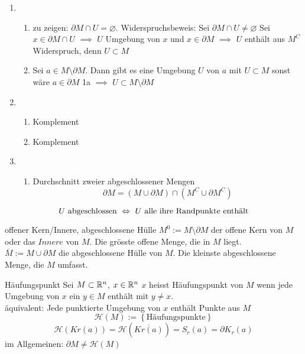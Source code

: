 \begin{Bew}
  \begin{enumerate}
    \item \begin{enumerate}
        \item zu zeigen: $\partial M\cap U=\varnothing$. Widerspruchsbeweis: Sei $\partial M\cap U\neq \varnothing$ Sei $x\in \partial M\cap U$ $\implies$ $U$ Umgebung von $x$ und $x\in\partial M$ $\implies$ $U$ enthält aus $M^C$ Widerspruch, denn $U\subset M$
        \item Sei $a\in M\setminus \partial M$. Dann gibt es eine Umgebung $U$ von $a$ mit $U\subset M$ sonst wäre $a\in \partial M$ 1a $\implies$ $U\subset M\setminus \partial M$
      \end{enumerate}
    \item\begin{enumerate}
        \item Komplement
        \item Komplement
      \end{enumerate}
    \item\begin{enumerate}
        \item Durchschnitt zweier abgeschlossener Mengen
          \[\partial M=(M\cup\partial M)\cap(M^C\cup \partial M^C)\]
      \end{enumerate}
  \end{enumerate}
\end{Bew}
\begin{Kor}
  \[U\ \text{abgeschlossen}\ \Lra\ U\ \text{alle ihre Randpunkte enthält}\]
\end{Kor}
\begin{Not}{offener Kern/Innere, abgeschlossene Hülle}
  $M^0:=M\setminus\partial M$ der offene Kern von $M$ oder das $Innere$ von $M$. Die grösste offene Menge, die in $M$ liegt.\\
  $\overline{M}:=M\cup\partial M$ die abgeschlossene Hülle von $M$. Die kleinste abgeschlossene Menge, die $M$ umfasst.
\end{Not}
\begin{Def}{Häufungspunkt}
  Sei $M\subset \mathbb{R}^n$, $x\in\mathbb{R}^n$ $x$ heisst Häufungspunkt von $M$ wenn jede Umgebung von $x$ ein $y\in M$ enthält mit $y\neq x$.\\
  äquivalent: Jede punktierte Umgebung von $x$ enthält Punkte aus $M$
  \[\mathcal{H}(M):=\left\{ \text{Häufungspunkte} \right\}\]
  \[\mathcal{H}(Kr(a))=\mathcal{H}(\overline{Kr(a)})=S_r(a)=\partial K_r(a)\]
  im Allgemeinen: $\partial M\neq \mathcal{H}(M)$
\end{Def}
